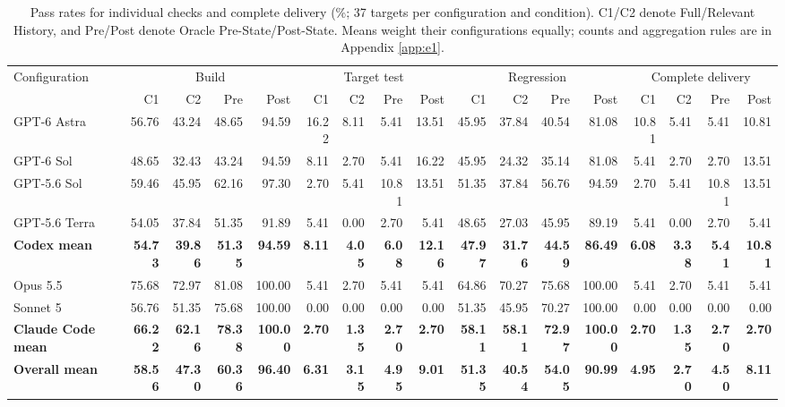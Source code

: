 \documentclass{article} %
\begin{document}
\begin{table}[htbp]
\caption{Pass rates for individual checks and complete delivery (\%; 37 targets per configuration and condition). C1/C2 denote Full/Relevant History, and Pre/Post denote Oracle Pre-State/Post-State. Means weight their configurations equally; counts and aggregation rules are in Appendix \ref{app:e1}.}
\label{tab:oracle-delivery}
\centering
\begingroup
\fontsize{8}{9.5}\selectfont
\setlength{\tabcolsep}{1pt}
\renewcommand{\arraystretch}{1.1}
\begin{tabular*}{\linewidth}{@{\extracolsep{\fill}}l*{16}{r}@{}}
\toprule
\multirow{2}{*}{Configuration} & \multicolumn{4}{c}{Build} & \multicolumn{4}{c}{Target test} & \multicolumn{4}{c}{Regression} & \multicolumn{4}{c}{Complete delivery} \\
\cmidrule(lr){2-5}\cmidrule(lr){6-9}\cmidrule(lr){10-13}\cmidrule(l){14-17}
 & C1 & C2 & Pre & Post & C1 & C2 & Pre & Post & C1 & C2 & Pre & Post & C1 & C2 & Pre & Post \\
\midrule
GPT-6 Astra & 56.76 & 43.24 & 48.65 & 94.59 & 16.22 & 8.11 & 5.41 & 13.51 & 45.95 & 37.84 & 40.54 & 81.08 & 10.81 & 5.41 & 5.41 & 10.81 \\
GPT-6 Sol & 48.65 & 32.43 & 43.24 & 94.59 & 8.11 & 2.70 & 5.41 & 16.22 & 45.95 & 24.32 & 35.14 & 81.08 & 5.41 & 2.70 & 2.70 & 13.51 \\
GPT-5.6 Sol & 59.46 & 45.95 & 62.16 & 97.30 & 2.70 & 5.41 & 10.81 & 13.51 & 51.35 & 37.84 & 56.76 & 94.59 & 2.70 & 5.41 & 10.81 & 13.51 \\
GPT-5.6 Terra & 54.05 & 37.84 & 51.35 & 91.89 & 5.41 & 0.00 & 2.70 & 5.41 & 48.65 & 27.03 & 45.95 & 89.19 & 5.41 & 0.00 & 2.70 & 5.41 \\
\textbf{Codex mean} & \textbf{54.73} & \textbf{39.86} & \textbf{51.35} & \textbf{94.59} & \textbf{8.11} & \textbf{4.05} & \textbf{6.08} & \textbf{12.16} & \textbf{47.97} & \textbf{31.76} & \textbf{44.59} & \textbf{86.49} & \textbf{6.08} & \textbf{3.38} & \textbf{5.41} & \textbf{10.81} \\
\addlinespace[2pt]
Opus 5.5 & 75.68 & 72.97 & 81.08 & 100.00 & 5.41 & 2.70 & 5.41 & 5.41 & 64.86 & 70.27 & 75.68 & 100.00 & 5.41 & 2.70 & 5.41 & 5.41 \\
Sonnet 5 & 56.76 & 51.35 & 75.68 & 100.00 & 0.00 & 0.00 & 0.00 & 0.00 & 51.35 & 45.95 & 70.27 & 100.00 & 0.00 & 0.00 & 0.00 & 0.00 \\
\textbf{Claude Code mean} & \textbf{66.22} & \textbf{62.16} & \textbf{78.38} & \textbf{100.00} & \textbf{2.70} & \textbf{1.35} & \textbf{2.70} & \textbf{2.70} & \textbf{58.11} & \textbf{58.11} & \textbf{72.97} & \textbf{100.00} & \textbf{2.70} & \textbf{1.35} & \textbf{2.70} & \textbf{2.70} \\
\midrule
\textbf{Overall mean} & \textbf{58.56} & \textbf{47.30} & \textbf{60.36} & \textbf{96.40} & \textbf{6.31} & \textbf{3.15} & \textbf{4.95} & \textbf{9.01} & \textbf{51.35} & \textbf{40.54} & \textbf{54.05} & \textbf{90.99} & \textbf{4.95} & \textbf{2.70} & \textbf{4.50} & \textbf{8.11} \\
\bottomrule
\end{tabular*}
\endgroup
\end{table}
\end{document}

